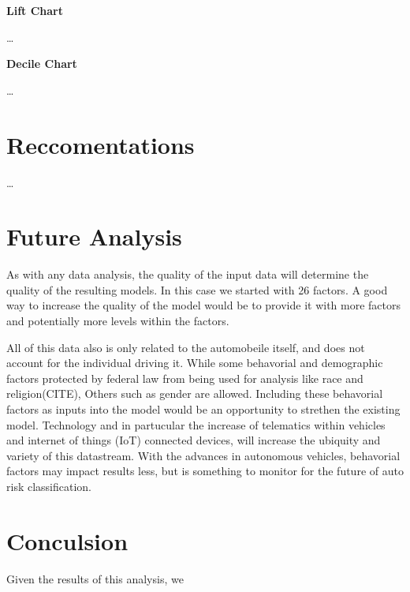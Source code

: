 \documentclass[12pt,openany]{book}
\begin{document}
\textbf{Lift Chart}

\ldots{}

\textbf{Decile Chart}

\ldots{}

\chapter{Reccomentations}\label{reccomentations}

\ldots{}

\chapter{Future Analysis}\label{future-analysis}

As with any data analysis, the quality of the input data will determine
the quality of the resulting models. In this case we started with 26
factors. A good way to increase the quality of the model would be to
provide it with more factors and potentially more levels within the
factors.

All of this data also is only related to the automobeile itself, and
does not account for the individual driving it. While some behavorial
and demographic factors protected by federal law from being used for
analysis like race and religion(CITE), Others such as gender are
allowed. Including these behavorial factors as inputs into the model
would be an opportunity to strethen the existing model. Technology and
in partucular the increase of telematics within vehicles and internet of
things (IoT) connected devices, will increase the ubiquity and variety
of this datastream. With the advances in autonomous vehicles, behavorial
factors may impact results less, but is something to monitor for the
future of auto risk classification.

\chapter{Conculsion}\label{conculsion}

Given the results of this analysis, we


\end{document}
